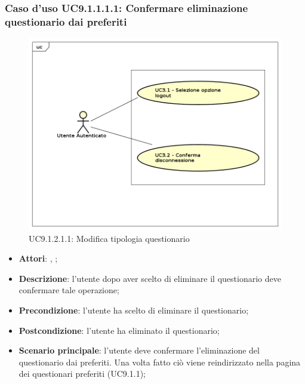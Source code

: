 					\subsubsection{Caso d'uso UC9.1.1.1.1: Confermare eliminazione questionario dai preferiti}
					\label{UC9.1.1.1.1}
					\begin{figure}[h]
						\centering
						\includegraphics[scale=0.7,keepaspectratio]{UML/UC9.png}
						\caption{UC9.1.2.1.1: Modifica tipologia questionario}
					\end{figure}
					\FloatBarrier
					\begin{itemize}
						\item \textbf{Attori}: \uau, \uaupro;
						\item \textbf{Descrizione}: l'utente dopo aver scelto di eliminare il questionario deve confermare tale operazione;
						\item \textbf{Precondizione}: l'utente ha scelto di eliminare il questionario;
						\item \textbf{Postcondizione}: l'utente ha eliminato il questionario;
						\item \textbf{Scenario principale}: l'utente deve confermare l'eliminazione del questionario dai preferiti. Una volta fatto ciò viene reindirizzato nella pagina dei questionari preferiti (UC9.1.1);
					\end{itemize}
					
